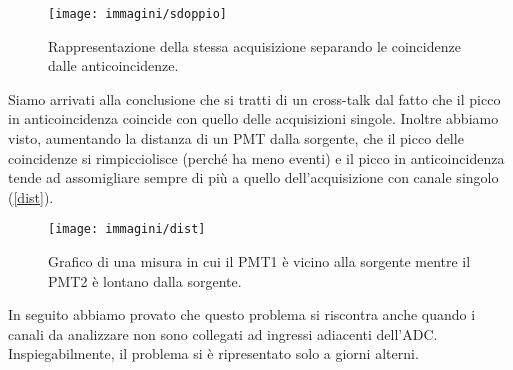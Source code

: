 \begin{figure}[h]
\centering
\texttt{[image: immagini/sdoppio]}
\caption{Rappresentazione della stessa acquisizione separando le coincidenze dalle anticoincidenze.}
\label{sdoppio}
\end{figure}

Siamo arrivati alla conclusione che si tratti di un cross-talk dal fatto che il picco in anticoincidenza coincide con quello delle acquisizioni singole. Inoltre abbiamo visto, aumentando la distanza di un PMT dalla sorgente, che il picco delle coincidenze si rimpicciolisce (perché ha meno eventi) e il picco in anticoincidenza tende ad assomigliare sempre di più a quello dell'acquisizione con canale singolo (\autoref{dist}).

\begin{figure}[h]
\centering
\texttt{[image: immagini/dist]}
\caption{Grafico di una misura in cui il PMT1 è vicino alla sorgente mentre il PMT2 è lontano dalla sorgente.}
\label{dist}
\end{figure}


 In seguito abbiamo provato che questo problema si riscontra anche quando i canali da analizzare non sono collegati ad ingressi adiacenti dell'ADC. Inspiegabilmente, il problema si è ripresentato solo a giorni alterni. 
